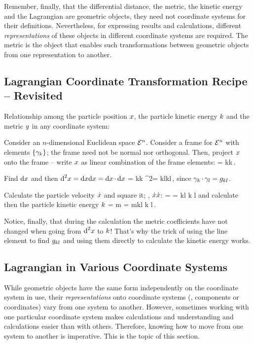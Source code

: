 Remember, finally, that the differential distance, the metric, the kinetic energy and the Lagrangian are geometric objects, they need not coordinate systems for their definitions. Nevertheless, for expressing results and calculations, different \emph{representations} of these objects in different coordinate systems are required. The metric is the object that enables such transformations between geometric objects from one representation to another.


\subsection{Lagrangian Coordinate Transformation Recipe -- Revisited}
Relationship among the particle position $x$, the particle kinetic energy $k$ and the metric $g$ in any coordinate system:

Consider an $n$-dimensional Euclidean space $\mathcal{E}^{n}$. Consider a frame for $\mathcal{E}^{n}$ with elements $\left\lbrace{\gamma_{k}}\right\rbrace$; the frame need not be normal nor orthogonal. Then, project $x$ onto the frame -- write $x$ as linear combination of the frame elements:
\beq
\pvec = \ifvec k\comp\pvec k\,.
\eeq

Find $\text{d}x$ and then $\text{d}^2x = \text{d}x\text{d}x = \text{d}x\operatorname{\cdot}\text{d}x$
\beq
  \dx\pvec = \ifvec k\dx\comp\pvec k\implies
\dx^2\pvec = \imet kl\comp\pvec k\comp\pvec l\,,
\eeq
since $\gamma_{k}\operatorname{\cdot}\gamma_{l} = g_{{k}{l}}$.

Calculate the particle velocity $\dot{x}$ and square it; \ie, $\dot{x}\dot{x}$:
\beq
\dt\pvec = \implies
\dt\pvec\dt\pvec = \imet kl\cntens{\dt\pvec} k\cntens{\dt\pvec} l
\eeq
and calculate then the particle kinetic energy $k$
\beq
\ken = m\dt\pvec\dt\pvec
     = m\imet kl\cntens{\dt\pvec} k\cntens{\dt\pvec} l\,.
\eeq

Notice, finally, that during the calculation the metric coefficients have not changed when going from $\text{d}^2x$ to $k$! That's why the trick of using the line element to find $g_{{k}{l}}$ and using them directly to calculate the kinetic energy works.



\subsection{Lagrangian in Various Coordinate Systems}
While geometric objects have the same form independently on the coordinate system in use, their \emph{representations} onto coordinate systems (\ie, components or coordinates) vary from one system to another. However, sometimes working with one particular coordinate system makes calculations and understanding and calculations easier than with others. Therefore, knowing how to move from one system to another is imperative. This is the topic of this section.


